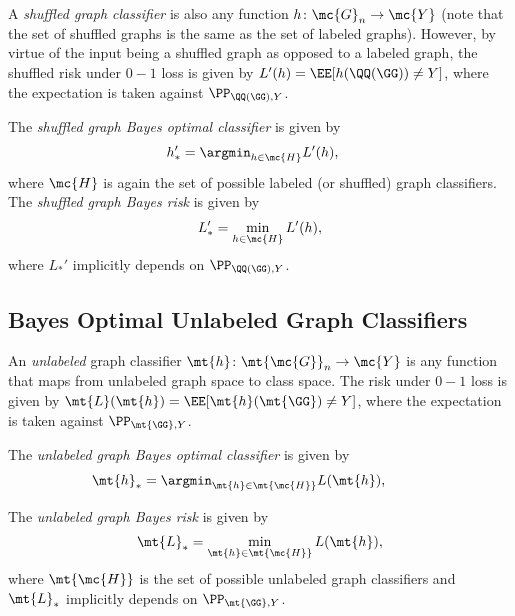 \documentclass[10pt,journal,cspaper,compsoc]{IEEEtran}
\begin{document}
A \emph{shuffled graph classifier} is also any function $h\colon \mc{G}_n \to \mc{Y}$ (note that the set of shuffled graphs is the same as the set of labeled graphs). However, by virtue of the input being a shuffled graph as opposed to a labeled graph, the shuffled risk under $0-1$ loss is given by $L'(h)=\EE[h(\QQ(\GG)) \neq Y]$, where the expectation is taken against $\PP_{\QQ(\GG),Y}$. %

The \emph{shuffled graph Bayes optimal classifier} is given by
\begin{align}
	h_*' &= \argmin_{h \in \mc{H}} L'(h), %
\end{align}
where $\mc{H}$ is again the set of possible labeled (or shuffled) graph classifiers. The \emph{shuffled graph Bayes risk} is given by
\begin{align}
	L_*' =\min_{h \in \mc{H}} L'(h),
\end{align}
where  $L_*'$ implicitly depends on $\PP_{\QQ(\GG),Y}$.  %

\subsection{Bayes Optimal Unlabeled Graph Classifiers} %


An \emph{unlabeled} graph classifier $\mt{h}\colon \mt{\mc{G}}_n \to \mc{Y}$ is any function that maps from unlabeled graph space to class space. The risk under $0-1$ loss is given by $\mt{L}(\mt{h})=\EE[\mt{h}(\mt{\GG})\neq Y]$, where the expectation is taken against $\PP_{\mt{\GG},Y}$. 

The \emph{unlabeled graph Bayes optimal classifier} is given by %
\begin{align}
	\mt{h}_* &= \argmin_{\mt{h} \in \mt{\mc{H}}} L(\mt{h}), \qquad %
\end{align}



The \emph{unlabeled graph Bayes risk} is given by %
\begin{align}
	\mt{L}_* =\min_{\mt{h} \in \mt{\mc{H}}} L(\mt{h}),
\end{align}
where $\mt{\mc{H}}$ is the set of possible unlabeled graph classifiers
and $\mt{L}_*$ implicitly depends on $\PP_{\mt{\GG},Y}$.  
\end{document}

